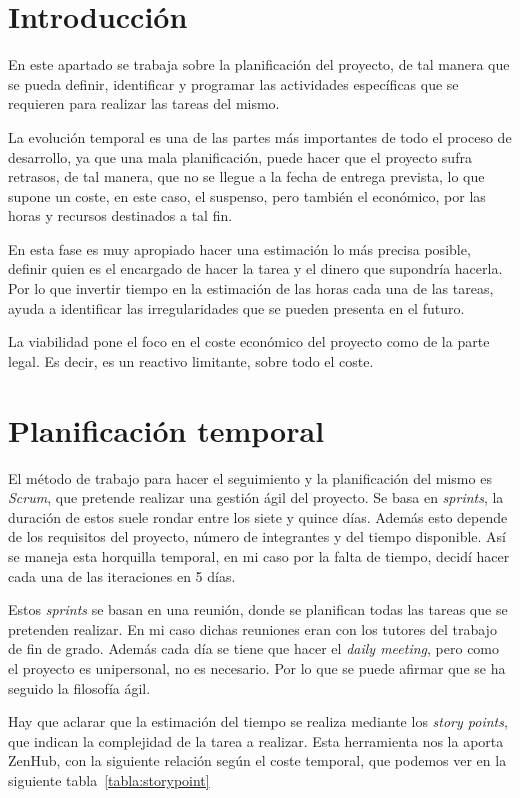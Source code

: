 
\section{Introducción}
En este apartado se trabaja sobre la planificación del proyecto, de tal manera que se pueda definir, identificar y programar las actividades específicas que se requieren para realizar las tareas del mismo. 

La evolución temporal es una de las partes más importantes de todo el proceso de desarrollo, ya que una mala planificación, puede hacer que el proyecto sufra retrasos, de tal manera, que no se llegue a la fecha de entrega prevista, lo que supone un coste, en este caso, el suspenso, pero también el económico, por las horas y recursos destinados a tal fin.

En esta fase es muy apropiado hacer una estimación lo más precisa posible, definir quien es el encargado de hacer la tarea y el dinero que supondría hacerla. Por lo que invertir tiempo en la estimación de las horas cada una de las tareas, ayuda a identificar las irregularidades que se pueden presenta en el futuro.

La viabilidad pone el foco en el coste económico del proyecto como de la parte legal. Es decir, es un reactivo limitante, sobre todo el coste.

\section{Planificación temporal}
El método de trabajo para hacer el seguimiento y la planificación del mismo es \emph{Scrum}, que pretende realizar una gestión ágil del proyecto. Se basa en \emph{sprints}, la duración de estos suele rondar entre los siete y quince días. Además esto depende de los requisitos del proyecto, número de integrantes y del tiempo disponible. Así se maneja esta horquilla temporal, en mi caso por la falta de tiempo, decidí hacer cada una de las iteraciones en 5 días. 

Estos \emph{sprints} se basan en una reunión, donde se planifican todas las tareas que se pretenden realizar. En mi caso dichas reuniones eran con los tutores del trabajo de fin de grado. Además cada día se tiene que hacer el \emph{daily meeting}, pero como el proyecto es unipersonal, no es necesario. Por lo que se puede afirmar que se ha seguido la filosofía ágil.

Hay que aclarar que la estimación del tiempo se realiza mediante los \emph{story points}, que indican la complejidad de la tarea a realizar. Esta herramienta nos la aporta ZenHub, con la siguiente relación según el coste temporal, que podemos ver en la siguiente tabla~\ref{tabla:storypoint}

